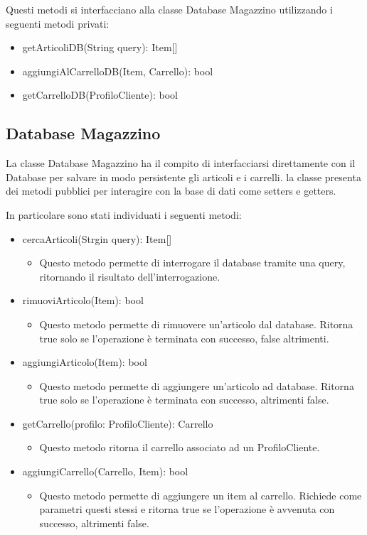 \documentclass{report}
\begin{document}
Questi metodi si interfacciano alla classe Database Magazzino utilizzando i seguenti metodi privati:
\begin{itemize}
	\item getArticoliDB(String query): Item[]
	\item aggiungiAlCarrelloDB(Item, Carrello): bool
	\item getCarrelloDB(ProfiloCliente): bool
\end{itemize}

\subsection*{Database Magazzino}

La classe Database Magazzino ha il compito di interfacciarsi direttamente con il Database per salvare in modo persistente gli articoli e i carrelli. la classe presenta dei metodi pubblici per interagire con la base di dati come setters e getters. 

In particolare sono stati individuati i seguenti metodi:


\begin{itemize}
	\item cercaArticoli(Strgin query): Item[]
	\begin{itemize}
		\item Questo metodo permette di interrogare il database tramite una query, ritornando il risultato dell'interrogazione. 
	\end{itemize}
	\item rimuoviArticolo(Item): bool
	\begin{itemize}
		\item Questo metodo permette di rimuovere un'articolo dal database. Ritorna true solo se l'operazione è terminata con successo, false altrimenti.
	\end{itemize}
	\item aggiungiArticolo(Item): bool
	\begin{itemize}
		\item Questo metodo permette di aggiungere un'articolo ad database. Ritorna true solo se l'operazione è terminata con successo, altrimenti false.
	\end{itemize}
	\item getCarrello(profilo: ProfiloCliente): Carrello
	\begin{itemize}
		\item Questo metodo ritorna il carrello associato ad un ProfiloCliente.
	\end{itemize}
	\item aggiungiCarrello(Carrello, Item): bool
	\begin{itemize}
		\item Questo metodo permette di aggiungere un item al carrello. Richiede come parametri questi stessi e ritorna true se l'operazione è avvenuta con successo, altrimenti false.
	\end{itemize}
	
\end{itemize}
\end{document}
